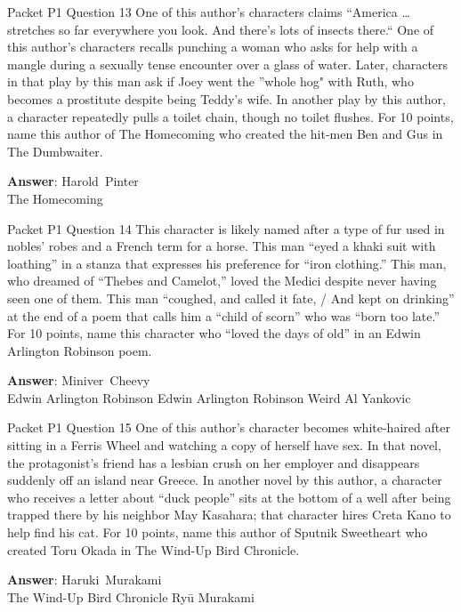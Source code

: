 \begin{frame}{Packet P1 Question 13}
One of this author's characters claims “America … stretches so far everywhere you look. And there's lots of insects there.`` One of this author's characters recalls punching a woman who asks for help with a mangle during a sexually tense encounter over a glass of water. Later, characters in that play by this man ask if Joey went the ''whole hog" with Ruth, who becomes a prostitute despite being Teddy's   wife. In another play by this author,   a character repeatedly pulls a toilet chain, though no toilet flushes. For 10 points, name this author of The Homecoming who created the hit-men   Ben and Gus in     The Dumbwaiter.

\textbf{Answer}: Harold\ Pinter\\
 The Homecoming
\end{frame}

\begin{frame}{Packet P1 Question 14}
This character is likely named after a type of fur used in nobles' robes and a French term for a horse. This man ``eyed a khaki suit with loathing'' in a stanza that expresses his preference for ``iron clothing.''   This man, who dreamed of ``Thebes and Camelot,'' loved   the Medici despite   never having seen one of them. This man ``coughed, and called   it fate, / And kept   on drinking'' at the end of a poem that calls him a ``child of scorn'' who was ``born too late.'' For 10 points, name this character who ``loved the days of old'' in an Edwin Arlington Robinson poem.  

\textbf{Answer}: Miniver\ Cheevy\\
 Edwin Arlington Robinson
 Edwin Arlington Robinson
 Weird Al Yankovic
\end{frame}

\begin{frame}{Packet P1 Question 15}
One of this author’s character becomes white-haired after sitting in a Ferris Wheel and watching a copy of herself have sex. In that novel, the protagonist’s friend has a lesbian crush on her employer and disappears suddenly off an island near Greece. In another novel by this author, a character who receives a letter about “duck people” sits at the bottom of a well after being trapped there by his neighbor May Kasahara; that character hires Creta Kano to help     find his cat. For 10 points, name this author of Sputnik Sweetheart who created   Toru Okada in The     Wind-Up Bird Chronicle.  

\textbf{Answer}: Haruki\ Murakami\\
 The Wind-Up Bird Chronicle
 Ryū Murakami
\end{frame}

